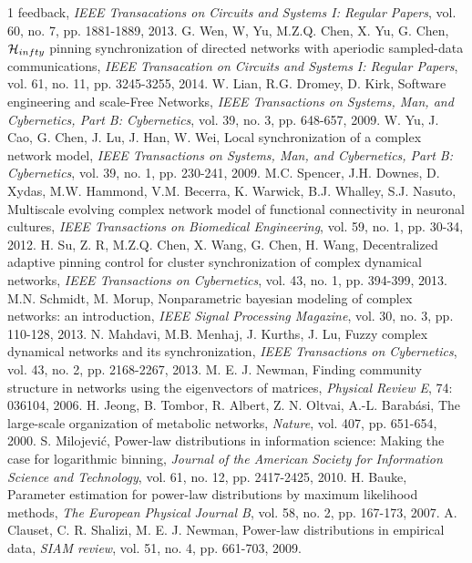 \documentclass[final]{IEEEtran}
\begin{document}
\begin{thebibliography}{1}
feedback, {\it IEEE Transacations on Circuits and Systems I:
Regular Papers}, vol. 60, no. 7, pp. 1881-1889, 2013.
 G. Wen, W, Yu, M.Z.Q. Chen, X. Yu, G. Chen, ${\cal H}_{infty}$ pinning synchronization of directed networks with aperiodic sampled-data communications, {\it IEEE Transacation on Circuits and Systems I: Regular Papers}, vol. 61, no. 11, pp. 3245-3255, 2014.
 W. Lian, R.G. Dromey, D. Kirk, Software engineering and scale-Free
Networks, {\it  IEEE Transactions on Systems, Man, and
Cybernetics, Part B: Cybernetics}, vol. 39, no. 3, pp. 648-657,
2009.
 W. Yu, J. Cao, G. Chen, J. Lu, J. Han, W. Wei, Local synchronization of a complex network
model, {\it  IEEE Transactions on Systems, Man, and Cybernetics,
Part B: Cybernetics}, vol. 39, no. 1, pp. 230-241, 2009.
 M.C. Spencer, J.H. Downes, D. Xydas, M.W. Hammond, V.M. Becerra, K. Warwick, B.J. Whalley, S.J.
Nasuto, Multiscale evolving complex network model of functional
connectivity in neuronal cultures, {\it IEEE Transactions on
Biomedical Engineering}, vol. 59, no. 1, pp. 30-34, 2012.
 H. Su, Z. R, M.Z.Q. Chen, X. Wang, G. Chen, H. Wang,
Decentralized adaptive pinning control for cluster synchronization
of complex dynamical networks, {\it IEEE Transactions on
Cybernetics}, vol. 43, no. 1, pp. 394-399, 2013.
 M.N. Schmidt, M. Morup, Nonparametric bayesian modeling of complex networks: an
introduction, {\it IEEE Signal Processing Magazine}, vol. 30, no.
3, pp. 110-128, 2013.
 N. Mahdavi, M.B. Menhaj, J. Kurths, J. Lu, Fuzzy complex dynamical networks and its
synchronization, {\it IEEE Transactions on Cybernetics}, vol. 43,
no. 2, pp. 2168-2267, 2013.
 M. E. J. Newman, Finding community structure in networks using the eigenvectors of
matrices, {\it Physical Review E}, 74: 036104, 2006.
 H. Jeong, B. Tombor, R. Albert, Z. N. Oltvai, A.-L.
Barab\'{a}si, The large-scale organization of metabolic networks,
{\it Nature}, vol. 407, pp. 651-654, 2000.
 S. Milojevi\'{c}, Power-law distributions in information science: Making the case for logarithmic
binning, {\it Journal of the American Society for Information
Science and Technology}, vol. 61, no. 12, pp. 2417-2425, 2010.
 H. Bauke, Parameter estimation for power-law distributions by maximum likelihood
methods, {\it The European Physical Journal B}, vol. 58, no. 2,
pp. 167-173, 2007.
 A. Clauset, C. R. Shalizi, M. E. J. Newman, Power-law distributions in empirical data, {\it SIAM review}, vol. 51, no. 4, pp. 661-703, 2009.

\end{thebibliography}
\end{document}
